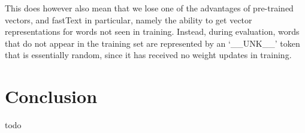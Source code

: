 This does however also mean that we lose one of the advantages of pre-trained
vectors, and fastText in particular, namely the ability to get vector
representations for words not seen in training. Instead, during evaluation,
words that do not appear in the training set are represented by an
`\_\_UNK\_\_' token that is essentially random, since it has received no
weight updates in training.


\section{Conclusion}

todo
